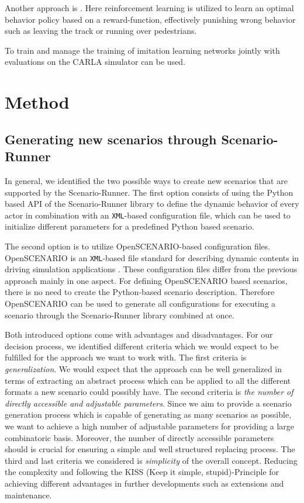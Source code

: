 \documentclass[conference, a4paper, 11pt]{IEEEtran}
\begin{document}
Another approach is  \cite{Toromanoff_2020_CVPR}. Here reinforcement learning is utilized to learn an optimal behavior policy based on a reward-function, effectively punishing wrong behavior such as leaving the track or running over pedestrians.

To train and manage the training of imitation learning networks jointly with evaluations on the CARLA simulator  \cite{felipecode:coiltraine} can be used.

\section{Method}

\subsection{Generating new scenarios through Scenario-Runner}
In general, we identified the two possible ways to create new scenarios that are supported by the Scenario-Runner.
The first option consists of using the Python based API of the Scenario-Runner library to define the dynamic behavior of every actor in combination with an \texttt{XML}-based configuration file, which can be used to initialize different parameters for a predefined Python based scenario.

The second option is to utilize OpenSCENARIO-based configuration files. OpenSCENARIO is an \texttt{XML}-based file standard for describing dynamic contents in driving simulation applications \cite{OpenScenario}. These configuration files differ from the previous approach mainly in one aspect. For defining OpenSCENARIO based scenarios, there is no need to create the Python-based scenario description. Therefore OpenSCENARIO can be used to generate all configurations for executing a scenario through the Scenario-Runner library combined at once. 

Both introduced options come with advantages and disadvantages. For our decision process, we identified different criteria which we would expect to be fulfilled for the approach we want to work with. 
The first criteria is \textit{generalization}. We would expect that the approach can be well generalized in terms of  extracting an abstract process which can be applied to all the different formats a new scenario could possibly have.
The second criteria is \textit{the number of directly accessible and adjustable parameters}. Since we aim to provide a scenario generation process which is capable of generating as many scenarios as possible, we want to achieve a high number of adjustable parameters for providing a large combinatoric basis. Moreover, the number of directly accessible parameters should is crucial for ensuring a simple and well structured replacing process.
The third and last criteria we considered is \textit{simplicity} of the overall concept. Reducing the complexity and  following the KISS (Keep it simple, stupid)-Principle for achieving different advantages in further developments such as extensions and maintenance. 
\end{document}
